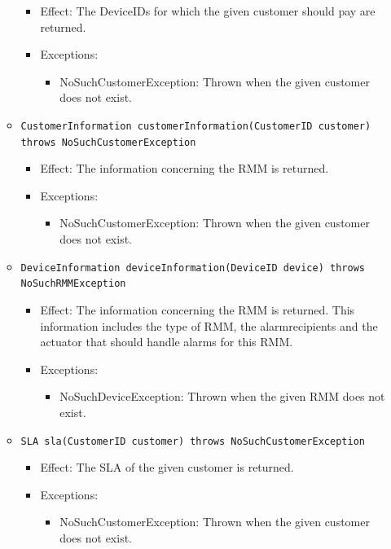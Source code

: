 \documentclass[a4paper,10pt]{article}
\begin{document}
\begin{itemize}
\begin{itemize}
        \begin{itemize}
            \item Effect: The DeviceIDs for which the given customer should pay are returned.
            \item Exceptions:
            \begin{itemize}
                \item NoSuchCustomerException: Thrown when the given customer does not exist.
            \end{itemize}
        \end{itemize}
        \item \texttt{CustomerInformation customerInformation(CustomerID customer) throws NoSuchCustomerException}
        \begin{itemize}
            \item Effect: The information concerning the RMM is returned.
            \item Exceptions:
            \begin{itemize}
                \item NoSuchCustomerException: Thrown when the given customer does not exist.
            \end{itemize}
        \end{itemize}
        \item \texttt{DeviceInformation deviceInformation(DeviceID device) throws NoSuchRMMException}
        \begin{itemize}
            \item Effect: The information concerning the RMM is returned. This information includes the type of RMM, the alarmrecipients and the actuator that should handle alarms for this RMM.
            \item Exceptions:
            \begin{itemize}
                \item NoSuchDeviceException: Thrown when the given RMM does not exist.
            \end{itemize}
        \end{itemize}
        \item \texttt{SLA sla(CustomerID customer) throws NoSuchCustomerException}
        \begin{itemize}
            \item Effect: The SLA of the given customer is returned.
            \item Exceptions:
            \begin{itemize}
                \item NoSuchCustomerException: Thrown when the given customer does not exist.
            \end{itemize}
        \end{itemize}
    \end{itemize}
\end{itemize}
\end{document}
